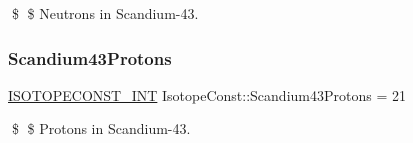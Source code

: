 \$ \$ Neutrons in Scandium-\/43. \mbox{\label{group___isotope_const-_scandium-_sc43_ga509cae9af68a6b377d8c6e82f0267c84}} 
\subsubsection{\texorpdfstring{Scandium43\+Protons}{Scandium43Protons}}
{\footnotesize\ttfamily \mbox{\hyperlink{group___isotope_const-_macros_ga5f18360b3e99483a35c32d789e62621c}{I\+S\+O\+T\+O\+P\+E\+C\+O\+N\+S\+T\+\_\+\+I\+NT}} Isotope\+Const\+::\+Scandium43\+Protons = 21}

\$ \$ Protons in Scandium-\/43. 